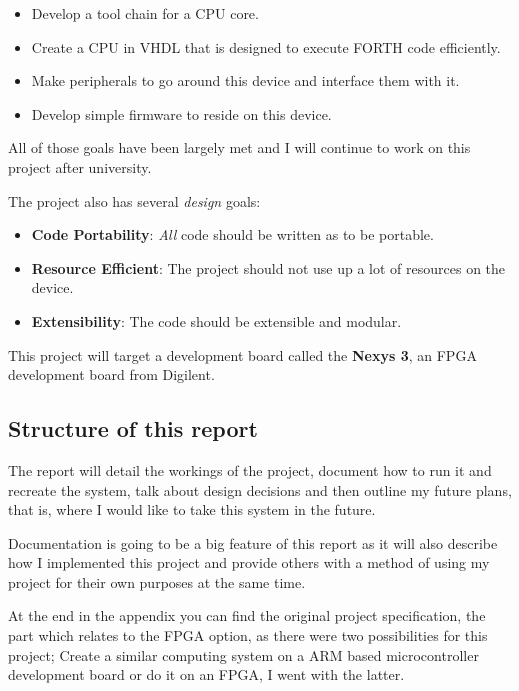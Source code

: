 \documentclass	[a4paper, 10pt]	{article}
\begin{document}
    \begin{itemize}
      \item Develop a tool chain for a CPU core.
      \item Create a CPU in VHDL that is designed to execute FORTH code efficiently.
      \item Make peripherals to go around this device and interface them with it.
      \item Develop simple firmware to reside on this device.
    \end{itemize}

    All of those goals have been largely met and I will continue to work on this project after
    university.

    The project also has several \emph{design} goals:

    \begin{itemize}
      \item \textbf{Code Portability}: \emph{All} code should be written as to be portable.
      \item \textbf{Resource Efficient}: The project should not use up a lot of resources on the device.
      \item \textbf{Extensibility}: The code should be extensible and modular.
    \end{itemize}

    This project will target a development board called the \textbf{Nexys 3}, an FPGA development
    board from Digilent. 

    \subsection{Structure of this report}

    The report will detail the workings of the project, document how to run it and recreate the
    system, talk about design decisions and then outline my future plans, that is, where I would
    like to take this system in the future.

    Documentation is going to be a big feature of this report as it will also describe how I
    implemented this project and provide others with a method of using my project for their
    own purposes at the same time.

    At the end in the appendix you can find the original project specification, the part which
    relates to the FPGA option, as there were two possibilities for this project; Create a
    similar computing system on a ARM based microcontroller development board or do it on
    an FPGA, I went with the latter.
\end{document}
